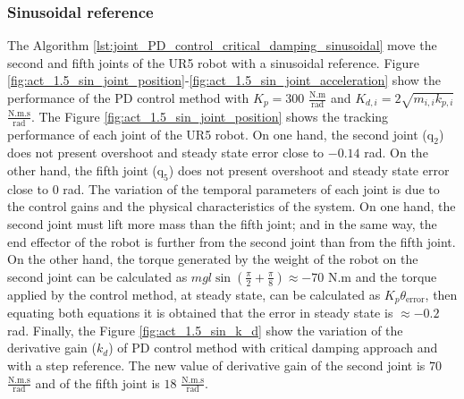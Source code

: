 \subsubsection{Sinusoidal reference}
The Algorithm \ref{lst:joint_PD_control_critical_damping_sinusoidal} move the second and fifth joints of the UR5 robot with a sinusoidal reference. Figure \ref{fig:act_1.5_sin_joint_position}-\ref{fig:act_1.5_sin_joint_acceleration} show the performance of the PD control method with $K_p=300$ $\mathrm{\frac{N.m}{rad}}$ and $K_{d,i}=2 \sqrt{m_{i,i} k_{p,i}}$ $\mathrm{\frac{N.m.s}{rad}}$. The Figure \ref{fig:act_1.5_sin_joint_position} shows the tracking performance of each joint of the UR5 robot. On one hand, the second joint ($\mathrm{q}_2$) does not present overshoot and steady state error close to $-0.14$ rad. On the other hand, the fifth joint ($\mathrm{q}_5$) does not present overshoot and steady state error close to $0$ rad. The variation of the temporal parameters of each joint is due to the control gains and the physical characteristics of the system. On one hand, the second joint must lift more mass than the fifth joint; and in the same way, the end effector of the robot is further from the second joint than from the fifth joint. On the other hand, the torque generated by the weight of the robot on the second joint can be calculated as $m g l \sin({\frac{\pi}{2} + \frac{\pi}{8}}) \approx -70$ N.m and the torque applied by the control method, at steady state, can be calculated as $K_p \theta_{\mathrm{error}}$, then equating both equations it is obtained that the error in steady state is $\approx -0.2$ rad. Finally, the Figure \ref{fig:act_1.5_sin_k_d} show the variation of the derivative gain ($k_d$) of PD control method with critical damping approach and with a step reference. The new value of derivative gain of the second joint is $70$ $\mathrm{\frac{N.m.s}{rad}}$ and of the fifth joint is $18$ $\mathrm{\frac{N.m.s}{rad}}$.  

